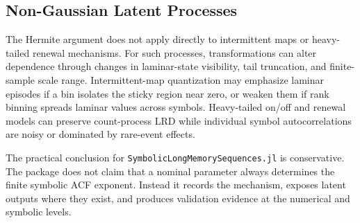 \documentclass[journal]{IEEEtran}
\newcommand{\pkg}[1]{\texttt{#1}}
\newcommand{\sfive}{\pkg{SymbolicLongMemorySequences.jl}}
\begin{document}
\subsection{Non-Gaussian Latent Processes}

The Hermite argument does not apply directly to intermittent maps or
heavy-tailed renewal mechanisms. For such processes, transformations can alter
dependence through changes in laminar-state visibility, tail truncation, and
finite-sample scale range. Intermittent-map quantization may emphasize laminar
episodes if a bin isolates the sticky region near zero, or weaken them if rank
binning spreads laminar values across symbols. Heavy-tailed on/off and renewal
models can preserve count-process LRD while individual symbol autocorrelations
are noisy or dominated by rare-event effects.

The practical conclusion for \sfive{} is conservative. The package
does not claim that a nominal parameter always determines the finite symbolic
ACF exponent. Instead it records the mechanism, exposes latent outputs where
they exist, and produces validation evidence at the numerical and symbolic
levels.



\end{document}
